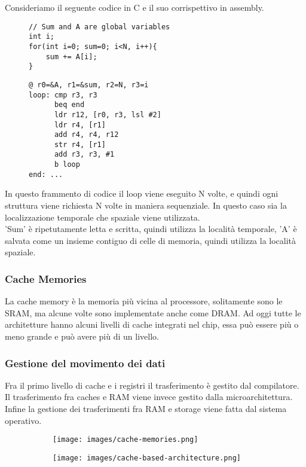 \noindent Consideriamo il seguente codice in C e il suo corrispettivo in assembly.
\begin{figure}[!h]
\begin{minipage}[t]{0.45\linewidth}
\centering
\begin{lstlisting}
// Sum and A are global variables
int i;
for(int i=0; sum=0; i<N, i++){
    sum += A[i];
}
\end{lstlisting}
\end{minipage}
\hspace{.35cm}
\begin{minipage}[t]{0.45\linewidth}
\begin{lstlisting}[language={[x86masm]Assembler}]
@ r0=&A, r1=&sum, r2=N, r3=i
loop: cmp r3, r3
      beq end
      ldr r12, [r0, r3, lsl #2]
      ldr r4, [r1]
      add r4, r4, r12
      str r4, [r1]
      add r3, r3, #1
      b loop
end: ...
\end{lstlisting}
\end{minipage}
\end{figure}

In questo frammento di codice il loop viene eseguito N volte, e quindi ogni struttura viene richiesta N volte in maniera sequenziale. In questo caso sia la localizzazione temporale che spaziale viene utilizzata.\\
'Sum' è ripetutamente letta e scritta, quindi utilizza la località temporale, 'A' è salvata come un insieme contiguo di celle di memoria, quindi utilizza la località spaziale.

\subsubsection{Cache Memories}
La cache memory è la memoria più vicina al processore, solitamente sono le SRAM, ma alcune volte sono implementate anche come DRAM. Ad oggi tutte le architetture hanno alcuni livelli di cache integrati nel chip, essa può essere più o meno grande e può avere più di un livello.

\subsubsection{Gestione del movimento dei dati}
Fra il primo livello di cache e i registri il trasferimento è gestito dal compilatore. Il trasferimento fra caches e RAM viene invece gestito dalla microarchitettura. Infine la gestione dei trasferimenti fra RAM e storage viene fatta dal sistema operativo.

\begin{figure}[h!]
    \centering
    \begin{subfigure}{.45\textwidth}
        \centering
        \texttt{[image: images/cache-memories.png]}
        \caption{}
    \end{subfigure}
    \begin{subfigure}{.45\textwidth}
        \centering
        \texttt{[image: images/cache-based-architecture.png]}
        \caption{}
    \end{subfigure}
\end{figure}
    

